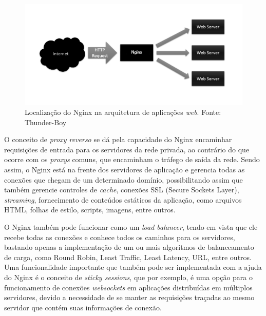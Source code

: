 \begin{figure}[!htb]
	\centering
	\includegraphics[scale=1]{imagens/nginx.png}
	\caption{\small Localização do Nginx na arquitetura de aplicações \textit{web}. Fonte: Thunder-Boy \cite{img-nginx}}
	\label{fig:nginx}
\end{figure}

O conceito de \textit{proxy reverso} se dá pela capacidade do Nginx encaminhar requisições de entrada para os servidores da rede privada, ao contrário do que ocorre com os \textit{proxys} comuns, que encaminham o tráfego de saída da rede. Sendo assim, o Nginx está na frente dos servidores de aplicação e gerencia todas as conexões que chegam de um determinado domínio, possibilitando assim que também gerencie controles de \textit{cache}, conexões SSL (Secure Sockets Layer), \textit{streaming}, fornecimento de conteúdos estáticos da aplicação, como arquivos HTML, folhas de estilo, scripts, imagens, entre outros.

O Nginx também pode funcionar como um \textit{load balancer}, tendo em vista que ele recebe todas as conexões e conhece todos os caminhos para os servidores, bastando apenas a implementação de um ou mais algoritmos de balanceamento de carga, como Round Robin, Least Traffic, Least Latency, URL, entre outros. Uma funcionalidade importante que também pode ser implementada com a ajuda do Nginx é o conceito de \textit{sticky sessions}, que por exemplo, é uma opção para o funcionamento de conexões \textit{websockets} em aplicações distribuídas em múltiplos servidores, devido a necessidade de se manter as requisições traçadas ao mesmo servidor que contém suas informações de conexão.